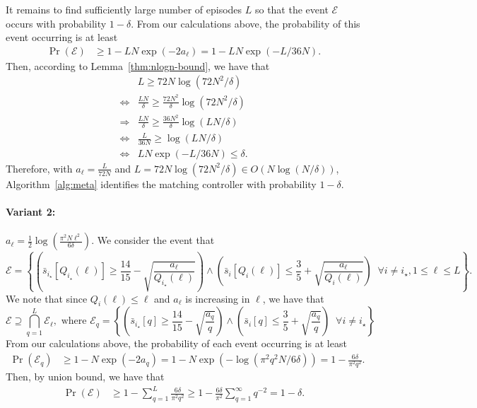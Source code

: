 \documentclass[11pt, twoside]{article}
\theoremstyle{definition}
\begin{document}
It remains to find sufficiently large number of episodes $L$ so that the event $\mathcal{E}$ occurs with probability $1-\delta$.
From our calculations above, the probability of this event occurring is at least
\begin{align*}
    \Pr(\mathcal{E})
    &\ge 1 - LN \exp(-2 a_\ell) = 1 - LN \exp(-L / 36N).
\end{align*}
Then, according to Lemma~\ref{thm:nlogn-bound}, we have that
\begin{align*}
    &L \ge 72N \log(72N^2/\delta) \\
    \Leftrightarrow{}& \frac{LN}{\delta} \ge \frac{72N^2}{\delta} \log(72N^2/\delta) \\
    \Rightarrow{}& \frac{LN}{\delta} \ge \frac{36N^2}{\delta} \log(LN/\delta) \\
    \Leftrightarrow{}& \frac{L}{36N} \ge \log(LN/\delta) \\
    \Leftrightarrow{}& LN \exp(-L/36N) \le \delta.
\end{align*}
Therefore, with $a_\ell = \frac{L}{72N}$ and $L = 72N \log(72N^2/\delta) \in O(N \log(N/\delta))$, Algorithm~\ref{alg:meta} identifies the matching controller with probability $1-\delta$.


\paragraph{Variant 2:} $a_\ell = \frac{1}{2} \log(\frac{\pi^2 N \ell^2}{6\delta})$.
We consider the event that
\[\mathcal{E} = \left\{\left(\bar{s}_{i_\star}[Q_{i_\star}(\ell)] \ge \frac{14}{15} - \sqrt{\frac{a_\ell}{Q_{i_\star}(\ell)}}\right) \wedge \left(\bar{s}_i[Q_i(\ell)] \le \frac{3}{5} + \sqrt{\frac{a_\ell}{Q_i(\ell)}}\right) \;\; \forall i \neq i_\star, 1 \le \ell \le L \right\}.\]
We note that since $Q_i(\ell) \le \ell$ and $a_\ell$ is increasing in $\ell$, we have that
\[\mathcal{E} \supseteq \bigcap_{q=1}^L \mathcal{E}_\ell, \text{ where } \mathcal{E}_q = \left\{\left(\bar{s}_{i_\star}[q] \ge \frac{14}{15} - \sqrt{\frac{a_q}{q}}\right) \wedge \left(\bar{s}_i[q] \le \frac{3}{5} + \sqrt{\frac{a_q}{q}}\right) \;\; \forall i \neq i_\star \right\}\]
From our calculations above, the probability of each event occurring is at least
\begin{align*}
    \Pr(\mathcal{E}_q)
    &\ge 1 - N \exp(-2 a_q) = 1 - N \exp(-\log(\pi^2q^2 N / 6\delta)) = 1 - \frac{6\delta}{\pi^2 q^2}.
\end{align*}
Then, by union bound, we have that
\begin{align*}
    \Pr(\mathcal{E})
    &\ge 1 - \sum_{q=1}^L \frac{6\delta}{\pi^2 q^2} \ge 1 - \frac{6\delta}{\pi^2} \sum_{q=1}^\infty q^{-2} = 1 - \delta.
\end{align*}
\end{document}
